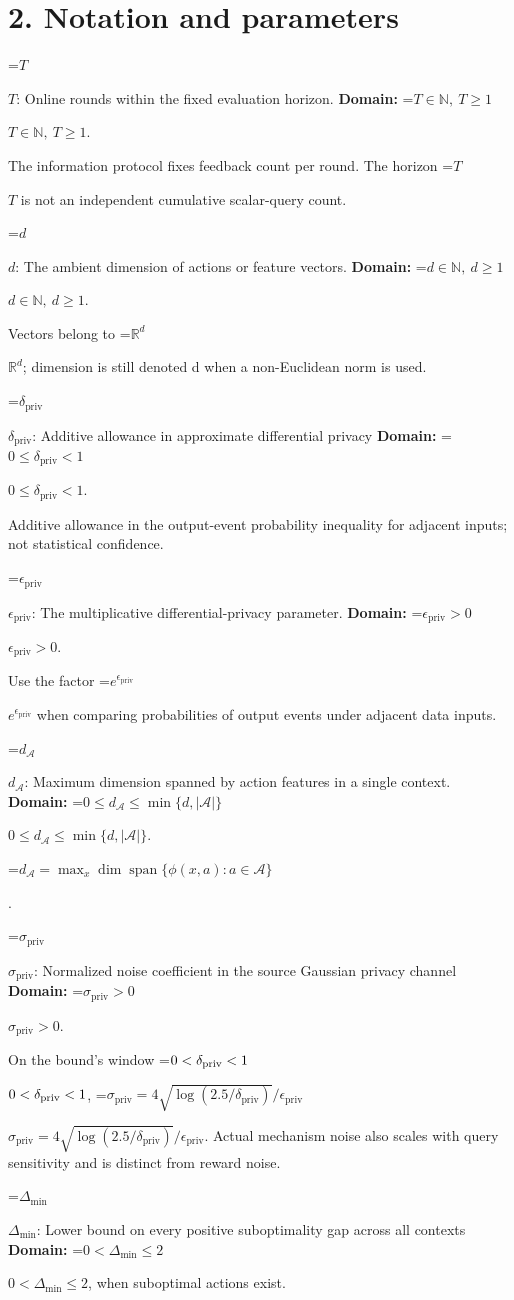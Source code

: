 \documentclass[10pt,a4paper]{article}
\newcommand{\AtlasMath}[1]{\par\begingroup\centering\setbox0=\hbox{$\displaystyle #1$}\ifdim\wd0>1.4\linewidth\typeout{ATLAS WIDE FORMULA: \the\wd0}\fi\ifdim\wd0>\linewidth\resizebox{\linewidth}{!}{\box0}\else\box0\fi\par\endgroup}
\newcommand{\AtlasInlineMath}[1]{\begingroup\setbox0=\hbox{$#1$}\ifdim\wd0>.4\linewidth\endgroup\AtlasMath{#1}\else\endgroup$#1$\fi}
\begin{document}
\section{2. Notation and parameters}
\AtlasInlineMath{T}: Online rounds within the fixed evaluation horizon. \textbf{Domain:} \AtlasInlineMath{T\in\mathbb N,\ T\ge1}.

The information protocol fixes feedback count per round. The horizon \AtlasInlineMath{T} is not an independent cumulative scalar-query count.

\AtlasInlineMath{d}: The ambient dimension of actions or feature vectors. \textbf{Domain:} \AtlasInlineMath{d\in\mathbb N,\ d\ge1}.

Vectors belong to \AtlasInlineMath{\mathbb R^d}; dimension is still denoted d when a non-Euclidean norm is used.

\AtlasInlineMath{\delta_{\mathrm{priv}}}: Additive allowance in approximate differential privacy \textbf{Domain:} \AtlasInlineMath{0\le\delta_{\mathrm{priv}}<1}.

Additive allowance in the output-event probability inequality for adjacent inputs; not statistical confidence.

\AtlasInlineMath{\epsilon_{\mathrm{priv}}}: The multiplicative differential-privacy parameter. \textbf{Domain:} \AtlasInlineMath{\epsilon_{\mathrm{priv}}>0}.

Use the factor \AtlasInlineMath{e^{\epsilon_{\mathrm{priv}}}} when comparing probabilities of output events under adjacent data inputs.

\AtlasInlineMath{d_{\mathcal A}}: Maximum dimension spanned by action features in a single context. \textbf{Domain:} \AtlasInlineMath{0\le d_{\mathcal A}\le\min\{d,|\mathcal A|\}}.


\AtlasMath{d_{\mathcal A}=\max_x\dim\operatorname{span}\{\phi(x,a):a\in\mathcal A\}}
.

\AtlasInlineMath{\sigma_{\mathrm{priv}}}: Normalized noise coefficient in the source Gaussian privacy channel \textbf{Domain:} \AtlasInlineMath{\sigma_{\mathrm{priv}}>0}.

On the bound's window \AtlasInlineMath{0<\delta_{\rm priv}<1}, \AtlasInlineMath{\sigma_{\mathrm{priv}}=4\sqrt{\log(2.5/\delta_{\mathrm{priv}})}/\epsilon_{\mathrm{priv}}}. Actual mechanism noise also scales with query sensitivity and is distinct from reward noise.

\AtlasInlineMath{\Delta_{\min}}: Lower bound on every positive suboptimality gap across all contexts \textbf{Domain:} \AtlasInlineMath{0<\Delta_{\min}\le2}, when suboptimal actions exist.
\end{document}
